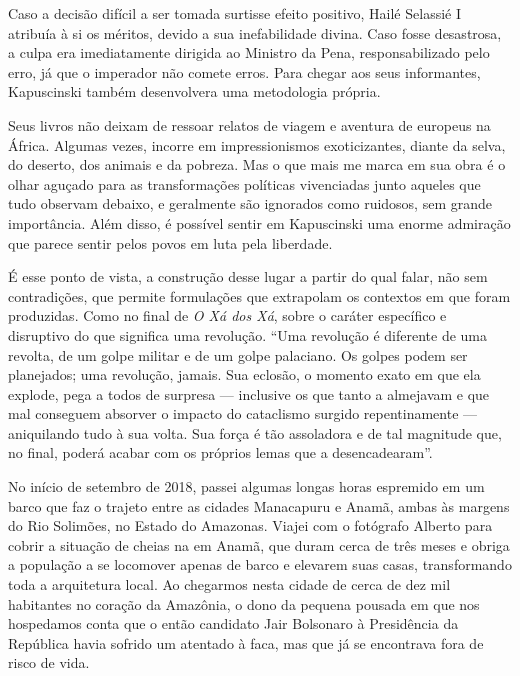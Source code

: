 Caso a decisão difícil a ser tomada surtisse efeito positivo, Hailé
Selassié I atribuía à si os méritos, devido a sua inefabilidade divina.
Caso fosse desastrosa, a culpa era imediatamente dirigida ao Ministro da
Pena, responsabilizado pelo erro, já que o imperador não comete erros.
Para chegar aos seus informantes, Kapuscinski também desenvolvera uma
metodologia própria.

Seus livros não deixam de ressoar relatos de viagem e aventura de
europeus na África. Algumas vezes, incorre em impressionismos
exoticizantes, diante da selva, do deserto, dos animais e da pobreza.
Mas o que mais me marca em sua obra é o olhar aguçado para as
transformações políticas vivenciadas junto aqueles que tudo observam
debaixo, e geralmente são ignorados como ruidosos, sem grande
importância. Além disso, é possível sentir em Kapuscinski uma enorme
admiração que parece sentir pelos povos em luta pela liberdade.

É esse ponto de vista, a construção desse lugar a partir do qual falar,
não sem contradições, que permite formulações que extrapolam os
contextos em que foram produzidas. Como no final de \emph{O Xá dos Xá},
sobre o caráter específico e disruptivo do que significa uma revolução.
``Uma revolução é diferente de uma revolta, de um golpe militar e de um
golpe palaciano. Os golpes podem ser planejados; uma revolução, jamais.
Sua eclosão, o momento exato em que ela explode, pega a todos de
surpresa --- inclusive os que tanto a almejavam e que mal conseguem
absorver o impacto do cataclismo surgido repentinamente --- aniquilando
tudo à sua volta. Sua força é tão assoladora e de tal magnitude que, no
final, poderá acabar com os próprios lemas que a desencadearam''.

\asterisc

No início de setembro de 2018, passei algumas longas horas espremido em
um barco que faz o trajeto entre as cidades Manacapuru e Anamã, ambas às
margens do Rio Solimões, no Estado do Amazonas. Viajei com o fotógrafo
Alberto para cobrir a situação de cheias na em Anamã, que duram cerca de
três meses e obriga a população a se locomover apenas de barco e
elevarem suas casas, transformando toda a arquitetura local. Ao
chegarmos nesta cidade de cerca de dez mil habitantes no coração da
Amazônia, o dono da pequena pousada em que nos hospedamos conta que o
então candidato Jair Bolsonaro à Presidência da República havia sofrido
um atentado à faca, mas que já se encontrava fora de risco de vida.

